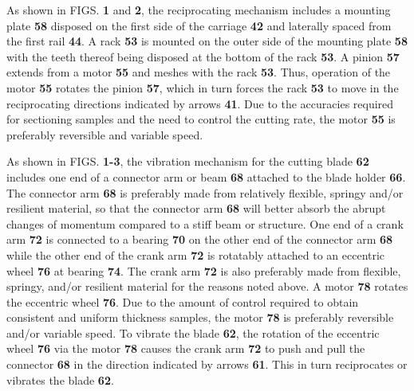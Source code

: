 \documentclass{article}
\begin{document}
As shown in FIGS. \textbf{1} and \textbf{2}, the reciprocating mechanism includes a mounting plate \textbf{58} disposed on the first side of the carriage \textbf{42} and laterally spaced from the first rail \textbf{44}. A rack \textbf{53} is mounted on the outer side of the mounting plate \textbf{58} with the teeth thereof being disposed at the bottom of the rack \textbf{53}. A pinion \textbf{57} extends from a motor \textbf{55} and meshes with the rack \textbf{53}. Thus, operation of the motor \textbf{55} rotates the pinion \textbf{57}, which in turn forces the rack \textbf{53} to move in the reciprocating directions indicated by arrows \textbf{41}. Due to the accuracies required for sectioning samples and the need to control the cutting rate, the motor \textbf{55} is preferably reversible and variable speed.

As shown in FIGS. \textbf{1-3}, the vibration mechanism for the cutting blade \textbf{62} includes one end of a connector arm or beam \textbf{68} attached to the blade holder \textbf{66}. The connector arm \textbf{68} is preferably made from relatively flexible, springy and/or resilient material, so that the connector arm \textbf{68} will better absorb the abrupt changes of momentum compared to a stiff beam or structure. One end of a crank arm \textbf{72} is connected to a bearing \textbf{70} on the other end of the connector arm \textbf{68} while the other end of the crank arm \textbf{72} is rotatably attached to an eccentric wheel \textbf{76} at bearing \textbf{74}. The crank arm \textbf{72} is also preferably made from flexible, springy, and/or resilient material for the reasons noted above. A motor \textbf{78} rotates the eccentric wheel \textbf{76}. Due to the amount of control required to obtain consistent and uniform thickness samples, the motor \textbf{78} is preferably reversible and/or variable speed. To vibrate the blade \textbf{62}, the rotation of the eccentric wheel \textbf{76} via the motor \textbf{78} causes the crank arm \textbf{72} to push and pull the connector \textbf{68} in the direction indicated by arrows \textbf{61}. This in turn reciprocates or vibrates the blade \textbf{62}.
\end{document}

